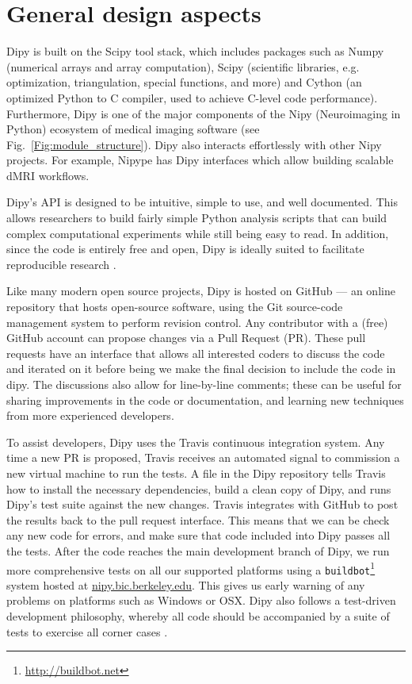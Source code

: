 \documentclass{bioinfo}
\begin{document}
\section{General design aspects}

Dipy is built on the Scipy tool stack, which includes packages such as
Numpy (numerical arrays and array computation), Scipy
(scientific libraries, e.g. optimization, triangulation, special functions,
and more) and Cython (an optimized Python to C compiler, used to achieve
C-level code performance).  Furthermore, Dipy is one of the major components of the Nipy (Neuroimaging in Python) ecosystem of medical imaging software (see
Fig.~\ref{Fig:module_structure}). Dipy also interacts effortlessly with other Nipy projects. For example, Nipype \citep{gorgolewski2011nipype} has Dipy interfaces which allow building scalable dMRI workflows.

Dipy's API is designed to be intuitive, simple to use, and well
documented.  This allows researchers to build fairly simple Python analysis
scripts that can build complex computational experiments while still being easy
to read.  In addition, since the code is entirely free and open, Dipy is ideally suited to facilitate reproducible research \citep{Donoho2010}.

Like many modern open source projects, Dipy is hosted on GitHub --- an online
repository that hosts open-source software, using the Git source-code
management system to perform revision control. Any contributor with a (free)
GitHub account can propose changes via a Pull Request (PR). These pull requests
have an interface that allows all interested coders to discuss the code and
iterated on it before being we make the final decision to include the code in
dipy. The discussions also allow for line-by-line comments; these can be useful
for sharing improvements in the code or documentation, and learning new
techniques from more experienced developers.

To assist developers, Dipy uses the Travis continuous integration system.  Any
time a new PR is proposed, Travis receives an automated signal to commission a
new virtual machine to run the tests.  A file in the Dipy repository tells
Travis how to install the necessary dependencies, build a clean copy of
Dipy, and runs Dipy's test suite against the new changes.  Travis integrates
with GitHub to post the results back to the pull request interface. This means
that we can be check any new code for errors, and make sure that code included
into Dipy passes all the tests. After the code reaches the main development
branch of Dipy, we run more comprehensive tests on all our supported
platforms using a \texttt{buildbot}\footnote{\url{http://buildbot.net}} system hosted at
\url{nipy.bic.berkeley.edu}. This gives us early warning of any problems on
platforms such as Windows or OSX.  Dipy also follows a test-driven development
philosophy, whereby all code should be accompanied by a suite of tests to
exercise all corner cases \citep{Maximilien2003}.
\end{document}
